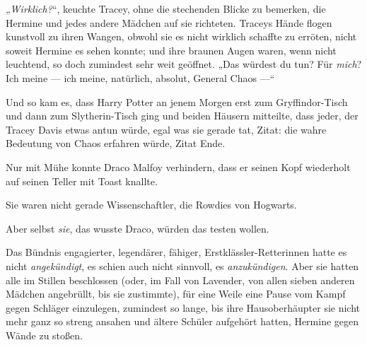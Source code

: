 „\emph{Wirklich?}“, keuchte Tracey, ohne die stechenden Blicke zu bemerken, die Hermine und jedes andere Mädchen auf sie richteten. Traceys Hände flogen kunstvoll zu ihren Wangen, obwohl sie es nicht wirklich schaffte zu erröten, nicht soweit Hermine es sehen konnte; und ihre braunen Augen waren, wenn nicht leuchtend, so doch zumindest sehr weit geöffnet.
„Das würdest du tun? Für \emph{mich}? Ich meine — ich meine, natürlich, absolut, General Chaos —“

\later

Und so kam es, dass Harry Potter an jenem Morgen erst zum Gryffindor-Tisch und dann zum Slytherin-Tisch ging und beiden Häusern mitteilte, dass jeder, der Tracey Davis etwas antun würde, egal was sie gerade tat, Zitat: die wahre Bedeutung von Chaos erfahren würde, Zitat Ende.

Nur mit Mühe konnte Draco Malfoy verhindern, dass er seinen Kopf wiederholt auf seinen Teller mit Toast knallte.

Sie waren nicht gerade Wissenschaftler, die Rowdies von Hogwarts.

Aber selbst \emph{sie}, das wusste Draco, würden das testen wollen.

\later

Das Bündnis engagierter, legendärer, fähiger, Erstklässler-Retterinnen hatte es nicht \emph{angekündigt}, es schien auch nicht sinnvoll, es \emph{anzukündigen}. Aber sie hatten alle im Stillen beschlossen (oder, im Fall von Lavender, von allen sieben anderen Mädchen angebrüllt, bis sie zustimmte), für eine Weile eine Pause vom Kampf gegen Schläger einzulegen, zumindest so lange, bis ihre Hausoberhäupter sie nicht mehr ganz so streng ansahen und ältere Schüler aufgehört hatten, Hermine gegen Wände zu stoßen.

